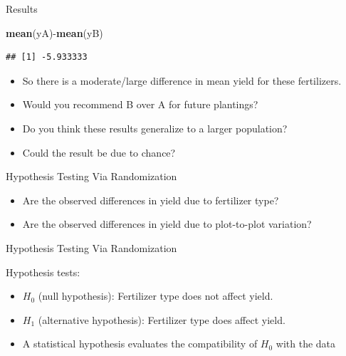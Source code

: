 \documentclass[9pt,ignorenonframetext,]{beamer}
\newenvironment{Shaded}{\begin{snugshade}}{\end{snugshade}}
\newcommand{\KeywordTok}[1]{\textcolor[rgb]{0.13,0.29,0.53}{\textbf{{#1}}}}
\newcommand{\NormalTok}[1]{{#1}}
\providecommand{\tightlist}{%
\setlength{\itemsep}{0pt}\setlength{\parskip}{0pt}}
\begin{document}
\begin{frame}[fragile]{Results}

\begin{Shaded}
\begin{Highlighting}[]
\KeywordTok{mean}\NormalTok{(yA)-}\KeywordTok{mean}\NormalTok{(yB)}
\end{Highlighting}
\end{Shaded}

\begin{verbatim}
## [1] -5.933333
\end{verbatim}

\begin{itemize}
\tightlist
\item
  So there is a moderate/large difference in mean yield for these
  fertilizers.
\item
  Would you recommend B over A for future plantings?
\item
  Do you think these results generalize to a larger population?
\item
  Could the result be due to chance?
\end{itemize}

\end{frame}

\begin{frame}{Hypothesis Testing Via Randomization}

\begin{itemize}
\tightlist
\item
  Are the observed differences in yield due to fertilizer type?
\item
  Are the observed differences in yield due to plot-to-plot variation?
\end{itemize}

\end{frame}

\begin{frame}{Hypothesis Testing Via Randomization}

Hypothesis tests:

\begin{itemize}
\item
  \(H_0\) (null hypothesis): Fertilizer type does not affect yield.
\item
  \(H_1\) (alternative hypothesis): Fertilizer type does affect yield.
\item
  A statistical hypothesis evaluates the compatibility of \(H_0\) with
  the data
\end{itemize}

\end{frame}
\end{document}

